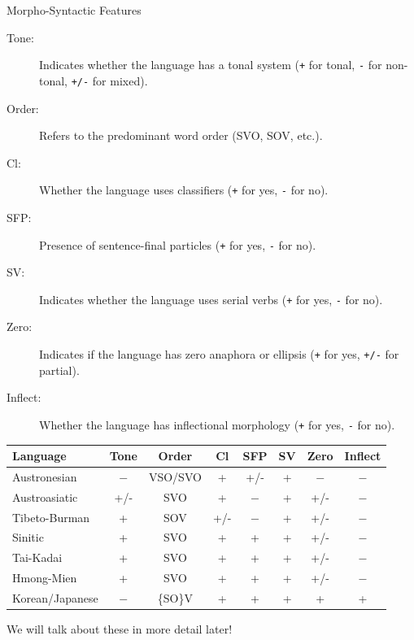 \documentclass{beamer}
\begin{document}
\begin{frame}[allowframebreaks]{Morpho-Syntactic Features}
\begin{description}
    \item[Tone:] Indicates whether the language has a tonal system (\texttt{+} for tonal, \texttt{-} for non-tonal, \texttt{+/-} for mixed).
    \item[Order:] Refers to the predominant word order (SVO, SOV, etc.).
    \item[Cl:] Whether the language uses classifiers (\texttt{+} for yes, \texttt{-} for no).
    \item[SFP:] Presence of sentence-final particles (\texttt{+} for yes, \texttt{-} for no).
    \item[SV:] Indicates whether the language uses serial verbs (\texttt{+} for yes, \texttt{-} for no).
    \item[Zero:] Indicates if the language has zero anaphora or ellipsis (\texttt{+} for yes, \texttt{+/-} for partial).
    \item[Inflect:] Whether the language has inflectional morphology (\texttt{+} for yes, \texttt{-} for no).
    \end{description}

    \framebreak

\begin{center}
\begin{tabular}{lccccccc}

 \textbf{Language}        & \textbf{Tone} & \textbf{Order} & \textbf{Cl} & \textbf{SFP} & \textbf{SV} & \textbf{Zero} & \textbf{Inflect} \\ \hline
Austronesian    & $-$ & VSO/SVO & + & +/- & + & $-$ & $-$ \\ 
Austroasiatic   & +/- & SVO & + & $-$ & + & +/- & $-$ \\ 
Tibeto-Burman   & + & SOV & +/- & $-$ & + & +/- & $-$ \\ 
Sinitic         & +  & SVO & +  & + & + & +/- & $-$ \\ 
Tai-Kadai       & +  & SVO & + & + & + & +/- & $-$ \\ 
Hmong-Mien      & +  & SVO & + & + & + & +/- & $-$ \\ 
Korean/Japanese & $-$  & \{SO\}V & + & + & + & + & + \\ 

  \end{tabular}
      \end{center}
We will talk about these in more detail later!
      
\end{frame}
\end{document}
